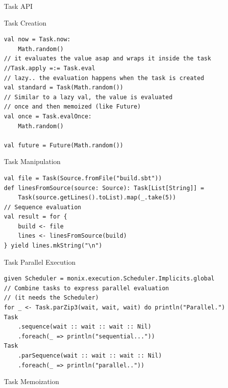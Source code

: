 \documentclass[presentation, 9pt]{beamer}\mode<presentation>{\usetheme{AMSBolognaFC}}
\begin{document}
\begin{frame}{Task API}
	\begin{alertblock}{Task Creation}
		\begin{tcolorbox}[left=0pt, top=0pt, bottom=0pt]
					 \begin{verbatim}
val now = Task.now:
	Math.random()
// it evaluates the value asap and wraps it inside the task
//Task.apply =:= Task.eval
// lazy.. the evaluation happens when the task is created
val standard = Task(Math.random())
// Similar to a lazy val, the value is evaluated 
// once and then memoized (like Future)
val once = Task.evalOnce:
	Math.random()

val future = Future(Math.random())
					 \end{verbatim}
				 \end{tcolorbox}
		 \end{alertblock}
		 \begin{alertblock}{Task Manipulation}
			\begin{tcolorbox}[left=0pt, top=0pt, bottom=0pt]
						 \begin{verbatim}
val file = Task(Source.fromFile("build.sbt"))
def linesFromSource(source: Source): Task[List[String]] = 
	Task(source.getLines().toList).map(_.take(5))
// Sequence evaluation
val result = for {
	build <- file
	lines <- linesFromSource(build)
} yield lines.mkString("\n")
						 \end{verbatim}
					 \end{tcolorbox}
			 \end{alertblock}
			 \begin{alertblock}{Task Parallel Execution}
				\begin{tcolorbox}[left=0pt, top=0pt, bottom=0pt]
							 \begin{verbatim}
given Scheduler = monix.execution.Scheduler.Implicits.global
// Combine tasks to express parallel evaluation
// (it needs the Scheduler)
for _ <- Task.parZip3(wait, wait, wait) do println("Parallel.")
Task
	.sequence(wait :: wait :: wait :: Nil)
	.foreach(_ => println("sequential..."))
Task
	.parSequence(wait :: wait :: wait :: Nil)
	.foreach(_ => println("parallel.."))
							 \end{verbatim}
						 \end{tcolorbox}
				 \end{alertblock}
				 \begin{alertblock}{Task Memoization}
					\begin{tcolorbox}[left=0pt, top=0pt, bottom=0pt]

\end{tcolorbox}
\end{alertblock}
\end{frame}
\end{document}
